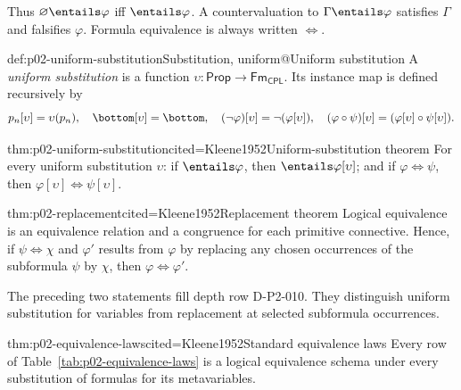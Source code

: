 Thus \(\varnothing\entails\varphi\) iff \(\entails\varphi\).  A
countervaluation to \(\Gamma\entails\varphi\) satisfies \(\Gamma\) and
falsifies \(\varphi\).  Formula equivalence is always written
\(\Leftrightarrow\).

\begin{hbdefinition}{def:p02-uniform-substitution}{Substitution, uniform@Uniform substitution}
A \emph{uniform substitution} is a function
\(\upsilon:\mathsf{Prop}\to\mathsf{Fm}_{\mathsf{CPL}}\).  Its instance map is
defined recursively by
\[
 p_n[\upsilon]=\upsilon(p_n),\quad \bottom[\upsilon]=\bottom,\quad
 (\neg\varphi)[\upsilon]=\neg(\varphi[\upsilon]),\quad
 (\varphi\circ\psi)[\upsilon]=
   (\varphi[\upsilon]\circ\psi[\upsilon]).
\]
\end{hbdefinition}

\begin{hbtheorem}{thm:p02-uniform-substitution}{cited=Kleene1952}{Uniform-substitution theorem}
For every uniform substitution \(\upsilon\): if \(\entails\varphi\), then
\(\entails\varphi[\upsilon]\); and if
\(\varphi\Leftrightarrow\psi\), then
\(\varphi[\upsilon]\Leftrightarrow\psi[\upsilon]\).
\end{hbtheorem}

\begin{hbtheorem}{thm:p02-replacement}{cited=Kleene1952}{Replacement theorem}
Logical equivalence is an equivalence relation and a congruence for each
primitive connective.  Hence, if \(\psi\Leftrightarrow\chi\) and
\(\varphi'\) results from \(\varphi\) by replacing any chosen occurrences
of the subformula \(\psi\) by \(\chi\), then
\(\varphi\Leftrightarrow\varphi'\).
\end{hbtheorem}

The preceding two statements fill depth row D-P2-010.  They distinguish
uniform substitution for variables from replacement at selected subformula
occurrences.

\begin{hbtheorem}{thm:p02-equivalence-laws}{cited=Kleene1952}{Standard equivalence laws}
Every row of Table~\ref{tab:p02-equivalence-laws} is a logical equivalence
schema under every substitution of formulas for its metavariables.
\end{hbtheorem}

